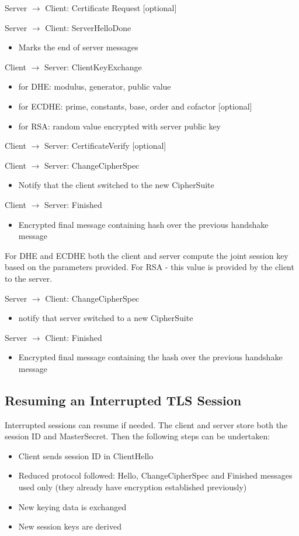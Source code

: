 Server $\rightarrow$ Client: Certificate Request [optional]

Server $\rightarrow$ Client: ServerHelloDone
\begin{itemize}
    \item Marks the end of server messages
\end{itemize}

Client $\rightarrow$ Server: ClientKeyExchange
\begin{itemize}
    \item for DHE: modulus, generator, public value
    \item for ECDHE: prime, constants, base, order and cofactor [optional]
    \item for RSA: random value encrypted with server public key
\end{itemize}

Client $\rightarrow$ Server: CertificateVerify [optional]

Client $\rightarrow$ Server: ChangeCipherSpec
\begin{itemize}
    \item Notify that the client switched to the new CipherSuite
\end{itemize}

Client $\rightarrow$ Server: Finished
\begin{itemize}
    \item Encrypted final message containing hash over the previous handshake message
\end{itemize}

For DHE and ECDHE both the client and server compute the joint session key based on the parameters provided. For RSA - this value is provided by the client to the server.

Server $\rightarrow$ Client: ChangeCipherSpec
\begin{itemize}
    \item notify that server switched to a new CipherSuite
\end{itemize}

Server $\rightarrow$ Client: Finished
\begin{itemize}
    \item Encrypted final message containing the hash over the previous handshake message
\end{itemize}

\subsection{Resuming an Interrupted TLS Session}
Interrupted sessions can resume if needed. The client and server store both the session ID and MasterSecret. Then the following steps can be undertaken:
\begin{itemize}
    \item Client sends session ID in ClientHello
    \item Reduced protocol followed: Hello, ChangeCipherSpec and Finished messages used only (they already have encryption established previously)
    \item New keying data is exchanged
    \item New session keys are derived
\end{itemize}


